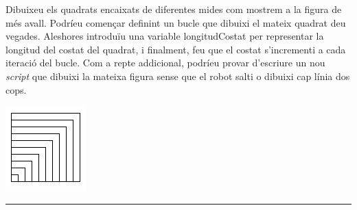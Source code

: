 \begin{center}
\colorbox{black}{}
\end{center}
{\small
\noindent
Dibuixeu els quadrats encaixats de diferentes mides com mostrem a la figura de més avall. Podríeu començar definint un bucle que dibuixi el mateix quadrat deu vegades. Aleshores introduïu una variable \textsf{longitudCostat} per representar la longitud del costat del quadrat, i finalment, feu que el costat s'incrementi a cada iteració del bucle. Com a repte addicional, podríeu provar d'escriure un nou \emph{script} que dibuixi la mateixa figura sense que el robot salti o dibuixi cap línia dos cops.}
\begin{center}
\includegraphics[scale=0.75]{Imatges/figuraE10-4.png}
\end{center}
\noindent
\rule{\textwidth}{3pt}

